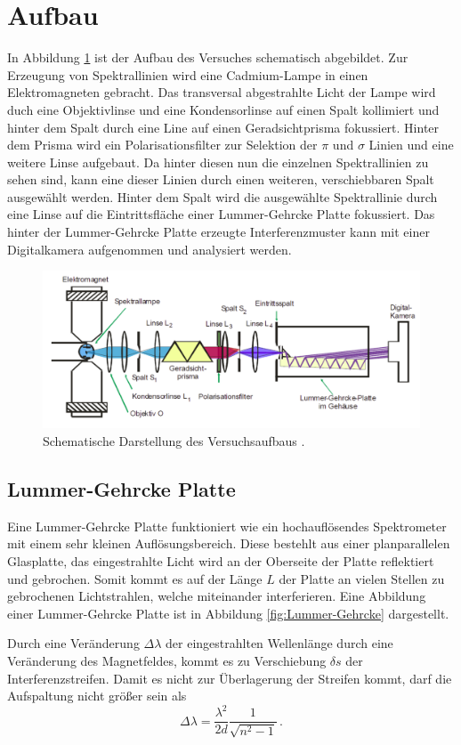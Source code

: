 \section{Aufbau}
In Abbildung \ref{fig:Aufbau} ist der Aufbau des Versuches schematisch abgebildet.
Zur Erzeugung von Spektrallinien wird eine Cadmium-Lampe in einen Elektromagneten gebracht.
Das transversal abgestrahlte Licht der Lampe wird duch eine Objektivlinse und eine Kondensorlinse auf einen Spalt kollimiert und hinter dem Spalt durch eine Line auf einen Geradsichtprisma fokussiert.
Hinter dem Prisma wird ein Polarisationsfilter zur Selektion der $\pi$ und $\sigma$ Linien und eine weitere Linse aufgebaut.
Da hinter diesen nun die einzelnen Spektrallinien zu sehen sind, kann eine dieser Linien durch einen weiteren, verschiebbaren Spalt ausgewählt werden.
Hinter dem Spalt wird die ausgewählte Spektrallinie durch eine Linse auf die Eintrittsfläche einer Lummer-Gehrcke Platte fokussiert.
Das hinter der Lummer-Gehrcke Platte erzeugte Interferenzmuster kann mit einer Digitalkamera aufgenommen und analysiert werden.

\begin{figure}[H]
  \centering
  \includegraphics[width = .7\textwidth]{images/Aufbau.png}
  \caption{Schematische Darstellung des Versuchsaufbaus \cite{Anleitung}.}
  \label{fig:Aufbau}
\end{figure}

\subsection{Lummer-Gehrcke Platte}

Eine Lummer-Gehrcke Platte funktioniert wie ein hochauflösendes Spektrometer mit einem sehr kleinen Auflösungsbereich.
Diese bestehlt aus einer planparallelen Glasplatte, das eingestrahlte Licht wird an der Oberseite der Platte reflektiert und gebrochen.
Somit kommt es auf der Länge $L$ der Platte an vielen Stellen zu gebrochenen Lichtstrahlen, welche miteinander interferieren.
Eine Abbildung einer Lummer-Gehrcke Platte ist in Abbildung \ref{fig:Lummer-Gehrcke} dargestellt.
\par\medskip
Durch eine Veränderung $\Delta \lambda$ der eingestrahlten Wellenlänge durch eine Veränderung des Magnetfeldes, kommt es zu Verschiebung $\delta s$ der Interferenzstreifen.
Damit es nicht zur Überlagerung der Streifen kommt, darf die Aufspaltung nicht größer sein als
\begin{equation*}
  \Delta \lambda = \frac{\lambda^2}{2d} \frac{1}{\sqrt{n^2-1}} \, .
\end{equation*}

